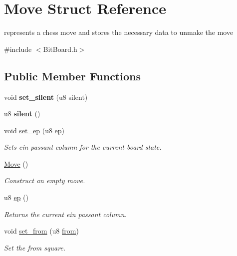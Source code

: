 \hypertarget{structMove}{}\section{Move Struct Reference}
\label{structMove}


represents a chess move and stores the necessary data to unmake the move  




{\ttfamily \#include $<$Bit\+Board.\+h$>$}

\subsection*{Public Member Functions}
\begin{DoxyCompactItemize}
\item 
\mbox{\label{structMove_a81041e9106678adac9749f895c6eee52}} 
void {\bfseries set\+\_\+silent} (u8 silent)
\item 
\mbox{\label{structMove_a7aa239149edacd70722d1490e8391842}} 
u8 {\bfseries silent} ()
\item 
void \hyperlink{structMove_a73a4d89daf1871694aebeb9f37cf205d}{set\+\_\+ep} (u8 \hyperlink{structMove_a70b0d186b359e6f3ef21a33e717ae0fa}{ep})
\begin{DoxyCompactList}\small\item\em Sets ein passant column for the current board state. \end{DoxyCompactList}\item 
\mbox{\label{structMove_a4b1acc3a67d30c385ad9a6000526393a}} 
\hyperlink{structMove_a4b1acc3a67d30c385ad9a6000526393a}{Move} ()
\begin{DoxyCompactList}\small\item\em Construct an empty move. \end{DoxyCompactList}\item 
u8 \hyperlink{structMove_a70b0d186b359e6f3ef21a33e717ae0fa}{ep} ()
\begin{DoxyCompactList}\small\item\em Returns the current ein passant column. \end{DoxyCompactList}\item 
void \hyperlink{structMove_a964e2bdf3924d22e85a750a7fbcb7b9d}{set\+\_\+from} (u8 \hyperlink{structMove_a3e6186e7f7e7ce520545c43f9f00679e}{from})
\begin{DoxyCompactList}\small\item\em Set the from square. \end{DoxyCompactList}\item 

\end{DoxyCompactItemize}
